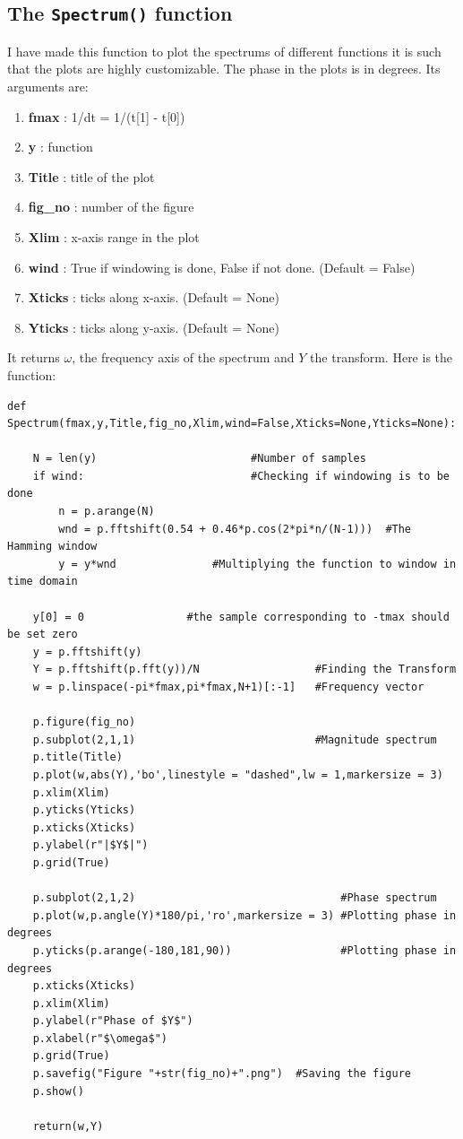\documentclass[11pt, a4paper]{article}
\begin{document}
    \subsection{The \texttt{Spectrum()} function}
    I have made this function to plot the spectrums of different functions it is  such that the plots are highly customizable. The phase in the plots is in degrees. Its arguments are:
        \begin{enumerate}
        \item \textbf{fmax} : 1/dt = 1/(t[1] - t[0])
        \item \textbf{y} : function
        \item \textbf{Title} : title of the plot
        \item \textbf{fig\_no} : number of the figure
        \item \textbf{Xlim} : x-axis range in the plot
        \item \textbf{wind} : True if windowing is done, False if not done. (Default = False)
        \item \textbf{Xticks} : ticks along x-axis. (Default = None)
        \item \textbf{Yticks} : ticks along y-axis. (Default = None)
        \end{enumerate}
    It returns $\omega$, the frequency axis of the spectrum and $Y$ the transform. Here is the function:
        \begin{verbatim}
def Spectrum(fmax,y,Title,fig_no,Xlim,wind=False,Xticks=None,Yticks=None):
    
    N = len(y)                        #Number of samples
    if wind:                          #Checking if windowing is to be done
        n = p.arange(N)
        wnd = p.fftshift(0.54 + 0.46*p.cos(2*pi*n/(N-1)))  #The Hamming window
        y = y*wnd               #Multiplying the function to window in time domain
        
    y[0] = 0                #the sample corresponding to -tmax should be set zero
    y = p.fftshift(y)
    Y = p.fftshift(p.fft(y))/N                  #Finding the Transform
    w = p.linspace(-pi*fmax,pi*fmax,N+1)[:-1]   #Frequency vector

    p.figure(fig_no)
    p.subplot(2,1,1)                            #Magnitude spectrum
    p.title(Title)
    p.plot(w,abs(Y),'bo',linestyle = "dashed",lw = 1,markersize = 3)
    p.xlim(Xlim)
    p.yticks(Yticks)
    p.xticks(Xticks)
    p.ylabel(r"|$Y$|")
    p.grid(True)
    
    p.subplot(2,1,2)                                #Phase spectrum
    p.plot(w,p.angle(Y)*180/pi,'ro',markersize = 3) #Plotting phase in degrees
    p.yticks(p.arange(-180,181,90))                 #Plotting phase in degrees
    p.xticks(Xticks)
    p.xlim(Xlim)
    p.ylabel(r"Phase of $Y$")
    p.xlabel(r"$\omega$")
    p.grid(True)
    p.savefig("Figure "+str(fig_no)+".png")  #Saving the figure
    p.show()
    
    return(w,Y)
        \end{verbatim}
\end{document}
